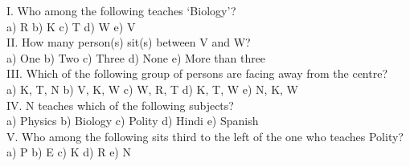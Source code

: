 \documentclass[
]{article}
\begin{document}
I. Who among the following teaches ‘Biology’?\\
a) R \hspace{2mm}b) K \hspace{2mm}c) T \hspace{2mm}d) W \hspace{2mm}e) V\\

II. How many person(s) sit(s) between V and W?\\
a) One \hspace{2mm}b) Two \hspace{2mm}c) Three \hspace{2mm}d) None \hspace{2mm}e) More than three\\

III. Which of the following group of persons are facing away from the centre?\\
a) K, T, N \hspace{2mm}b) V, K, W \hspace{2mm}c) W, R, T \hspace{2mm}d) K, T, W \hspace{2mm}e) N, K, W\\

IV. N teaches which of the following subjects?\\
a) Physics \hspace{2mm}b) Biology \hspace{2mm}c) Polity \hspace{2mm}d) Hindi \hspace{2mm}e) Spanish\\

V. Who among the following sits third to the left of the one who teaches Polity?\\
a) P \hspace{2mm}b) E \hspace{2mm}c) K \hspace{2mm}d) R \hspace{2mm}e) N\\
\end{document}
